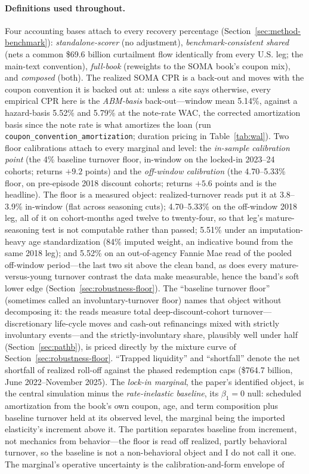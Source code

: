\documentclass[12pt]{article}
\begin{document}
\paragraph{Definitions used throughout.} Four accounting bases attach to every recovery percentage (Section~\ref{sec:method-benchmark}): \emph{standalone-scorer} (no adjustment), \emph{benchmark-consistent shared} (nets a common \$69.6 billion curtailment flow identically from every U.S. leg; the main-text convention), \emph{full-book} (reweights to the SOMA book's coupon mix), and \emph{composed} (both). The realized SOMA CPR is a back-out and moves with the coupon convention it is backed out at: unless a site says otherwise, every empirical CPR here is the \emph{ABM-basis} back-out---window mean 5.14\%, against a hazard-basis 5.52\% and 5.79\% at the note-rate WAC, the corrected amortization basis since the note rate is what amortizes the loan (run \texttt{coupon\_convention\_amortization}; duration pricing in Table~\ref{tab:wal}). Two floor calibrations attach to every marginal and level: the \emph{in-sample calibration point} (the 4\% baseline turnover floor, in-window on the locked-in 2023--24 cohorts; returns $+9.2$ points) and the \emph{off-window calibration} (the 4.70--5.33\% floor, on pre-episode 2018 discount cohorts; returns $+5.6$ points and is the headline). The floor is a measured object: realized-turnover reads put it at 3.8--3.9\% in-window (flat across seasoning cuts); 4.70--5.33\% on the off-window 2018 leg, all of it on cohort-months aged twelve to twenty-four, so that leg's mature-seasoning test is not computable rather than passed; 5.51\% under an imputation-heavy age standardization (84\% imputed weight, an indicative bound from the same 2018 leg); and 5.52\% on an out-of-agency Fannie Mae read of the pooled off-window period---the last two sit above the clean band, as does every mature-versus-young turnover contrast the data make measurable, hence the band's soft lower edge (Section~\ref{sec:robustness-floor}). The ``baseline turnover floor'' (sometimes called an involuntary-turnover floor) names that object without decomposing it: the reads measure total deep-discount-cohort turnover---discretionary life-cycle moves and cash-out refinancings mixed with strictly involuntary events---and the strictly-involuntary share, plausibly well under half (Section~\ref{sec:pathb}), is priced directly by the mixture curve of Section~\ref{sec:robustness-floor}. ``Trapped liquidity'' and ``shortfall'' denote the net shortfall of realized roll-off against the phased redemption caps (\$764.7 billion, June 2022--November 2025). The \emph{lock-in marginal}, the paper's identified object, is the central simulation minus the \emph{rate-inelastic baseline}, its $\beta_1 = 0$ null: scheduled amortization from the book's own coupon, age, and term composition plus baseline turnover held at its observed level, the marginal being the imported elasticity's increment above it. The partition separates baseline from increment, not mechanics from behavior---the floor is read off realized, partly behavioral turnover, so the baseline is not a non-behavioral object and I do not call it one. The marginal's operative uncertainty is the calibration-and-form envelope of 
\end{document}
